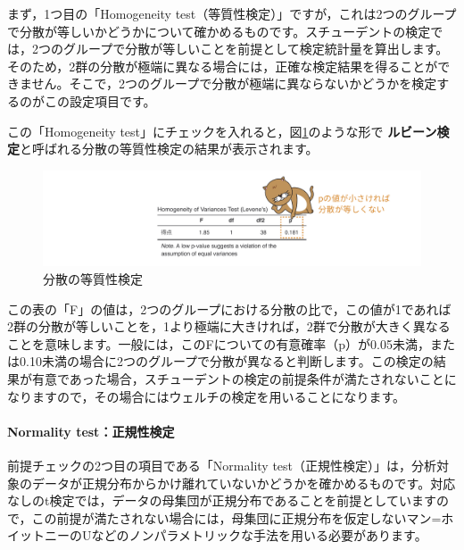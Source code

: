 \documentclass[
  12pt,
  a5jpaper,
  lualatex, ja=standard]{bxjsbook}
\renewcommand{\emph}[1]{\textbf{\color{emph} #1}}
\begin{document}
まず，1つ目の「Homogeneity test（等質性検定）」ですが，これは2つのグループで分散が等しいかどうかについて確かめるものです。スチューデントの検定では，2つのグループで分散が等しいことを前提として検定統計量を算出します。そのため，2群の分散が極端に異なる場合には，正確な検定結果を得ることができません。そこで，2つのグループで分散が極端に異ならないかどうかを検定するのがこの設定項目です。

この「Homogeneity test」にチェックを入れると，図\ref{fig:ttests-levene}のような形で\emph{ルビーン検定}と呼ばれる分散の等質性検定の結果が表示されます。

\begin{figure}[!ht]

{\centering \includegraphics[width=1\linewidth]{images/ttests/levene} 

}

\caption{分散の等質性検定}\label{fig:ttests-levene}
\end{figure}

この表の「F」の値は，2つのグループにおける分散の比で，この値が1であれば2群の分散が等しいことを，1より極端に大きければ，2群で分散が大きく異なることを意味します。一般には，このFについての有意確率（p）が0.05未満，または0.10未満の場合に2つのグループで分散が異なると判断します。この検定の結果が有意であった場合，スチューデントの検定の前提条件が満たされないことになりますので，その場合にはウェルチの検定を用いることになります。

\hypertarget{normality-testux6b63ux898fux6027ux691cux5b9a}{%
\paragraph*{Normality test：正規性検定}\label{normality-testux6b63ux898fux6027ux691cux5b9a}}

前提チェックの2つ目の項目である「Normality test（正規性検定）」は，分析対象のデータが正規分布からかけ離れていないかどうかを確かめるものです。対応なしのt検定では，データの母集団が正規分布であることを前提としていますので，この前提が満たされない場合には，母集団に正規分布を仮定しないマン=ホイットニーのUなどのノンパラメトリックな手法を用いる必要があります。
\end{document}
